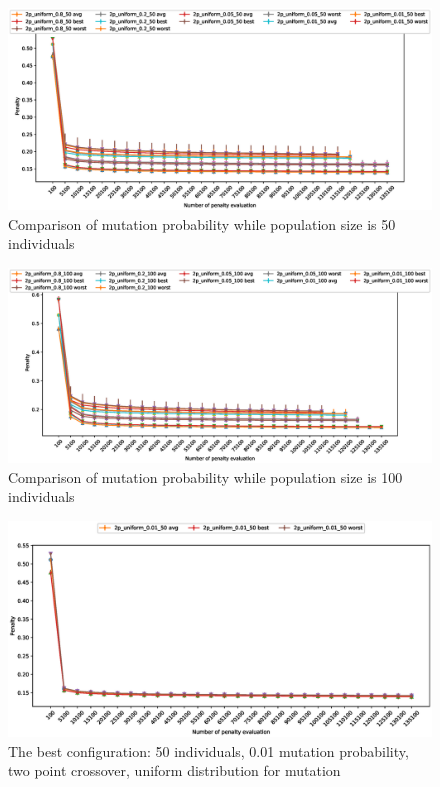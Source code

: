 \documentclass{article}
\begin{document}
\begin{figure}
    \centering
    \includegraphics[width=5.0in]{mutation_probability_comparison_population_50}
    \caption{Comparison of mutation probability while population size is 50 individuals}
    \label{mutationprobcomp2}
\end{figure}

\begin{figure}
    \centering
    \includegraphics[width=5.0in]{mutation_probability_comparison_population_100}
    \caption{Comparison of mutation probability while population size is 100 individuals}
    \label{mutationprobcomp3}
\end{figure}

\begin{figure}
    \centering
    \includegraphics[width=5.0in]{best_configuration}
    \caption{The best configuration: 50 individuals, 0.01 mutation probability, two point crossover, uniform distribution for mutation}
    \label{bestconfiguration}
\end{figure}
\end{document}
